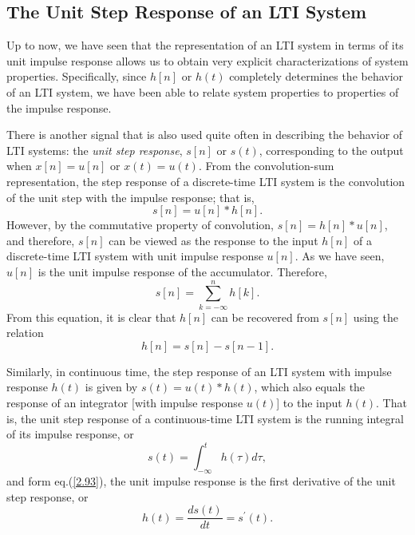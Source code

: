 \documentclass[a4paper,twoside]{book}
\begin{document}
\subsection{The Unit Step Response of an LTI System}

Up to now, we have seen that the representation of an LTI system in terms of its unit impulse response allows us to obtain very explicit characterizations of system properties. Specifically, since $h[n]$ or $h(t)$ completely determines the behavior of an LTI system, we have been able to relate system properties  to properties of the impulse response.

There is another signal that is also used quite often in describing the behavior of LTI systems: the \textit{unit step response}, $s[n]$ or $s(t)$, corresponding to the output when $x[n]=u[n]$ or $x(t)=u(t)$. From the convolution-sum representation, the step response of a discrete-time LTI system is the convolution of the unit step with the impulse response; that is, $$s[n]=u[n]*h[n].$$ However, by the commutative property of convolution, $s[n]=h[n]*u[n]$, and therefore, $s[n]$ can be viewed as the response to the input $h[n]$ of a discrete-time LTI system with unit impulse response $u[n]$. As we have seen, $u[n]$ is the unit impulse response of the accumulator. Therefore,
\begin{equation}
    s[n]=\sum_{k=-\infty}^nh[k].
    \label{2.91}
\end{equation}
From this equation, it is clear that $h[n]$ can be recovered from $s[n]$ using the relation
\begin{equation}
    h[n]=s[n]-s[n-1].
    \label{2.92}
\end{equation}

Similarly, in continuous time, the step response of an LTI system with impulse response $h(t)$ is given by $s(t)=u(t)*h(t)$, which also equals the response of an integrator [with impulse response $u(t)$] to the input $h(t)$. That is, the unit step response of a continuous-time LTI system is the running integral of its impulse response, or
\begin{equation}
    s(t)=\int_{-\infty}^th(\tau)d\tau,
    \label{2.93}
\end{equation}
and form eq.\;(\ref{2.93}), the unit impulse response is the first derivative of the unit step response, or
\begin{equation}
    h(t)=\frac{ds(t)}{dt}=s^{\prime}(t).
    \label{2.94}
\end{equation}
\end{document}
